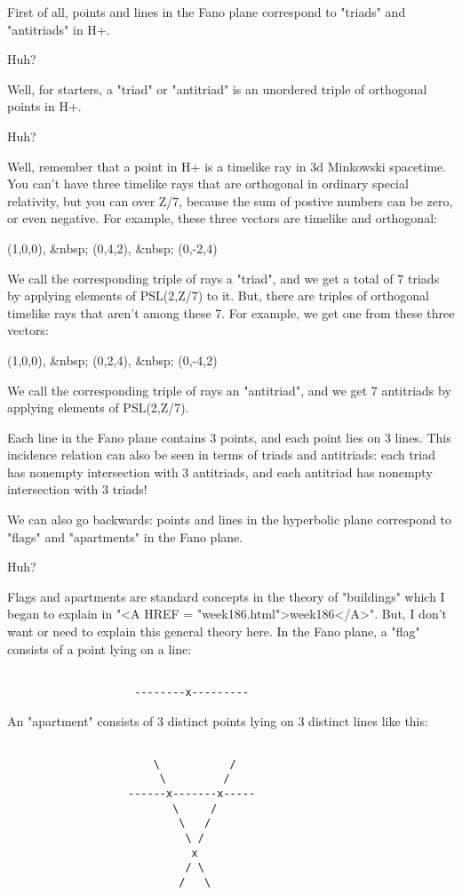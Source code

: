 First of all, points and lines in the Fano plane correspond to "triads" and 
"antitriads" in H+.

Huh?  

Well, for starters, a "triad" or "antitriad" is an unordered triple of orthogonal 
points in H+.   

Huh?  

Well, remember that a point in H+ is a timelike ray in 3d Minkowski spacetime.
You can't have three timelike rays that are orthogonal in ordinary special 
relativity, but you can over Z/7, because the sum of postive numbers can be zero, 
or even negative.  For example, these three vectors are timelike and orthogonal:

(1,0,0), &nbsp; (0,4,2),  &nbsp; (0,-2,4)

We call the corresponding triple of rays a 
"triad", and we get a total of 7 triads 
by applying elements of PSL(2,Z/7) to it.  But, there are triples of orthogonal 
timelike rays that aren't among these 7.  For example, we get one from these three 
vectors:

(1,0,0),  &nbsp; (0,2,4), &nbsp; (0,-4,2)

We call the corresponding triple of rays an "antitriad", 
and we get 7  
antitriads by applying elements of PSL(2,Z/7).

Each line in the Fano plane contains 3 points, and each point lies on 3
lines.  This incidence relation can also be seen in terms of triads and
antitriads: each triad has nonempty intersection with 3 antitriads, and
each antitriad has nonempty intersection with 3 triads!

We can also go backwards: points and lines in the hyperbolic plane correspond
to "flags" and "apartments" in the Fano plane.  

Huh?

Flags and apartments are standard concepts in the 
theory of "buildings"
which I began to explain in "<A HREF = "week186.html">week186</A>".  
But, I don't want or need to explain
this general theory here.  In the Fano plane, a "flag" 
consists of a point
lying on a line:

\begin{verbatim}
                  
                    --------x---------
\end{verbatim}
    
An "apartment" 
consists of 3 distinct points lying on 3 distinct lines like
this:

\begin{verbatim}

                       \           /
                        \         /
                   ------x-------x-----
                          \     /
                           \   /
                            \ /
                             x
                            / \
                           /   \
\end{verbatim}
    
